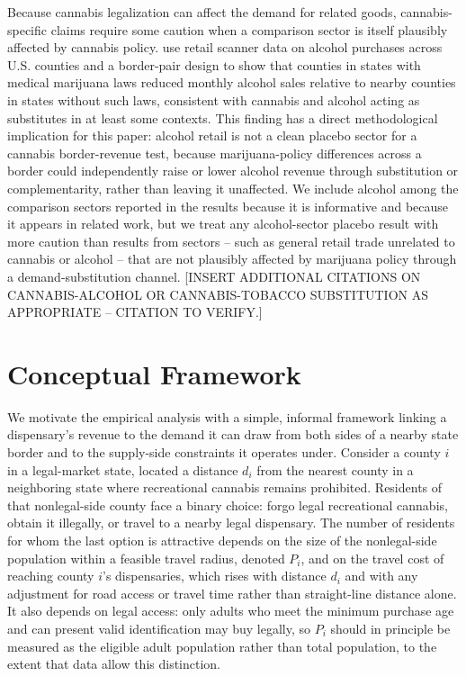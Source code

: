 \documentclass[12pt]{article}
\begin{document}
Because cannabis legalization can affect the demand for related goods, cannabis-specific claims require
some caution when a comparison sector is itself plausibly affected by cannabis policy. \citet{BaggioChongKwon2020}
use retail scanner data on alcohol purchases across U.S. counties and a border-pair design to show that
counties in states with medical marijuana laws reduced monthly alcohol sales relative to nearby counties in
states without such laws, consistent with cannabis and alcohol acting as substitutes in at least some
contexts. This finding has a direct methodological implication for this paper: alcohol retail is not a
clean placebo sector for a cannabis border-revenue test, because marijuana-policy differences across a
border could independently raise or lower alcohol revenue through substitution or complementarity, rather
than leaving it unaffected. We include alcohol among the comparison sectors reported in the results because
it is informative and because it appears in related work, but we treat any alcohol-sector placebo result
with more caution than results from sectors -- such as general retail trade unrelated to cannabis or
alcohol -- that are not plausibly affected by marijuana policy through a demand-substitution channel. [INSERT
ADDITIONAL CITATIONS ON CANNABIS-ALCOHOL OR CANNABIS-TOBACCO SUBSTITUTION AS APPROPRIATE -- CITATION TO
VERIFY.]

\section{Conceptual Framework}

We motivate the empirical analysis with a simple, informal framework linking a dispensary's revenue to the
demand it can draw from both sides of a nearby state border and to the supply-side constraints it operates
under. Consider a county $i$ in a legal-market state, located a distance $d_i$ from the nearest county in a
neighboring state where recreational cannabis remains prohibited. Residents of that nonlegal-side county
face a binary choice: forgo legal recreational cannabis, obtain it illegally, or travel to a nearby legal
dispensary. The number of residents for whom the last option is attractive depends on the size of the
nonlegal-side population within a feasible travel radius, denoted $P_i$, and on the travel cost of reaching
county $i$'s dispensaries, which rises with distance $d_i$ and with any adjustment for road access or
travel time rather than straight-line distance alone. It also depends on legal access: only adults who meet
the minimum purchase age and can present valid identification may buy legally, so $P_i$ should in principle
be measured as the eligible adult population rather than total population, to the extent that data allow
this distinction.
\end{document}
